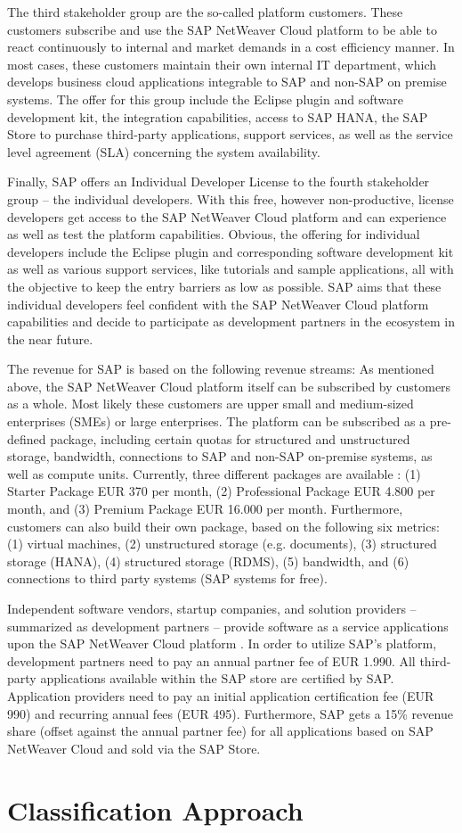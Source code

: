 The third stakeholder group are the so-called platform customers. These customers subscribe and use the SAP NetWeaver Cloud platform to be able to react continuously to internal and market demands in a cost efficiency manner. In most cases, these customers maintain their own internal IT department, which develops business cloud applications integrable to SAP and non-SAP on premise systems. The offer for this group include the Eclipse plugin and software development kit, the integration capabilities, access to SAP HANA, the SAP Store to purchase third-party applications, support services, as well as the service level agreement (SLA) concerning the system availability.

Finally, SAP offers an Individual Developer License to the fourth stakeholder group -- the individual developers. With this free, however non-productive, license developers get access to the SAP NetWeaver Cloud platform and can experience as well as test the platform capabilities. Obvious, the offering for individual developers include the Eclipse plugin and corresponding software development kit as well as various support services, like tutorials and sample applications, all with the objective to keep the entry barriers as low as possible. SAP aims that these individual developers feel confident with the SAP NetWeaver Cloud platform capabilities and decide to participate as development partners in the ecosystem in the near future.

The revenue for SAP is based on the following revenue streams: As mentioned above, the SAP NetWeaver Cloud platform itself can be subscribed by customers as a whole. Most likely these customers are upper small and medium-sized enterprises (SMEs) or large enterprises. The platform can be subscribed as a pre-defined package, including certain quotas for structured and unstructured storage, bandwidth, connections to SAP and non-SAP on-premise systems, as well as compute units. Currently, three different packages are available \citep{SAP2013b}: (1) Starter Package EUR 370 per month, (2) Professional Package EUR 4.800 per month, and (3) Premium Package EUR 16.000 per month. Furthermore, customers can also build their own package, based on the following six metrics: (1) virtual machines, (2) unstructured storage (e.g. documents), (3) structured storage (HANA), (4) structured storage (RDMS), (5) bandwidth, and (6) connections to third party systems (SAP systems for free). 

Independent software vendors, startup companies, and solution providers -- summarized as development partners -- provide software as a service applications upon the SAP NetWeaver Cloud platform \citep{SAP2013a}. In order to utilize SAP's platform, development partners need to pay an annual partner fee of EUR 1.990. All third-party applications available within the SAP store are certified by SAP. Application providers need to pay an initial application certification fee (EUR 990) and recurring annual fees (EUR 495). Furthermore, SAP gets a 15\% revenue share (offset against the annual partner fee) for all applications based on SAP NetWeaver Cloud and sold via the SAP Store.



\section{Classification Approach}\label{ch:sota:cm}

